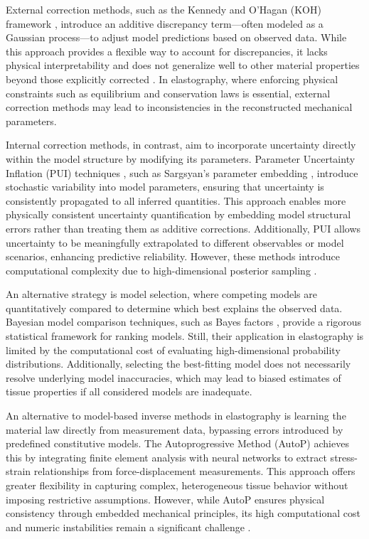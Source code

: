 External correction methods, such as the Kennedy and O’Hagan (KOH) framework \cite{kennedy2001bayesian}, introduce an additive discrepancy term—often modeled as a Gaussian process—to adjust model predictions based on observed data. While this approach provides a flexible way to account for discrepancies, it lacks physical interpretability \cite{berliner2008modeling} and does not generalize well to other material properties beyond those explicitly corrected \cite{andres2024model}. In elastography, where enforcing physical constraints such as equilibrium and conservation laws is essential, external correction methods may lead to inconsistencies in the reconstructed mechanical parameters.

Internal correction methods, in contrast, aim to incorporate uncertainty directly within the model structure by modifying its parameters. Parameter Uncertainty Inflation (PUI) techniques \cite{pernot2017critical, pernot2017parameter}, such as Sargsyan’s parameter embedding \cite{sargsyan2015statistical, sargsyan2019embedded}, introduce stochastic variability into model parameters, ensuring that uncertainty is consistently propagated to all inferred quantities. This approach enables more physically consistent uncertainty quantification by embedding model structural errors rather than treating them as additive corrections. Additionally, PUI allows uncertainty to be meaningfully extrapolated to different observables or model scenarios, enhancing predictive reliability. However, these methods introduce computational complexity due to high-dimensional posterior sampling \cite{pernot2017critical}.

An alternative strategy is model selection, where competing models are quantitatively compared to determine which best explains the observed data. Bayesian model comparison techniques, such as Bayes factors \cite{kass1995bayes}, provide a rigorous statistical framework for ranking models. Still, their application in elastography is limited by the computational cost of evaluating high-dimensional probability distributions. Additionally, selecting the best-fitting model does not necessarily resolve underlying model inaccuracies, which may lead to biased estimates of tissue properties if all considered models are inadequate. 

An alternative to model-based inverse methods in elastography is learning the material law directly from measurement data, bypassing errors introduced by predefined constitutive models. The Autoprogressive Method (AutoP) \cite{hoerig2021machine, newman2024improving} achieves this by integrating finite element analysis with neural networks to extract stress-strain relationships from force-displacement measurements. This approach offers greater flexibility in capturing complex, heterogeneous tissue behavior without imposing restrictive assumptions. However, while AutoP ensures physical consistency through embedded mechanical principles, its high computational cost and numeric instabilities remain a significant challenge \cite{newman2024improving}. 

